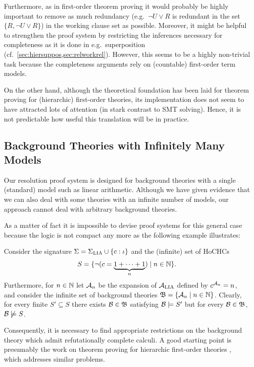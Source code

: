 \documentclass[a4paper,twoside,notitlepage,openright,11pt]{report}
\begin{document}
Furthermore, as in first-order theorem proving it would probably be highly important to remove as much redundancy (e.g.\ $\neg U\lor R$ is redundant in the set $\{R,\neg U\lor R\}$) in the working clause set as possible. Moreover, it might be helpful to strengthen the proof system by restricting the inferences necessary for completeness as it is done in e.g.\ superposition (cf.\ \cref{sec:hiersuppos,sec:relworkrel}). However, this seems to be a highly non-trivial task because the completeness arguments rely on (countable) first-order term models.

On the other hand, although the theoretical foundation has been laid for theorem proving for (hierarchic) first-order theories, its implementation does not seem to have attracted lots of attention (in stark contrast to SMT solving). Hence, it is not predictable how useful this translation will be in practice.

\subsection{Background Theories with Infinitely Many Models}
Our resolution proof system is designed for background theories with a single (standard) model such as linear arithmetic. 
Although we have given evidence that we can also deal with some theories with an infinite number of models, our approach cannot deal with arbitrary background theories.

As a matter of fact it is impossible to devise proof systems for this general case because the logic is not compact any more as the following example illustrates:
\begin{example}
  \label{ex:notcompact}
  Consider the signature $\Sigma=\Sigma_{\operatorname{LIA}}\cup\{c:\iota\}$ and the (infinite) set of HoCHCs
  \begin{align*}
    S=\{\neg (c= \underbrace{1+\cdots+1}_n)\mid n\in\mathbb N\}.
  \end{align*}
  Furthermore, for $n\in\mathbb N$ let $\mathcal A_n$ be the expansion of $\mathcal A_{\operatorname{LIA}}$ defined by $c^{\mathcal A_n}=n$, and consider the infinite set of background theories $\mathfrak B=\{\mathcal A_n\mid n\in\mathbb N\}$. Clearly, for every finite $S'\subseteq S$ there exists $\mathcal B\in\mathfrak B$ satisfying $\mathcal B\models S'$ but for every $\mathcal B\in\mathfrak B$, $\mathcal B\not\models S$.
\end{example}
Consequently, it is necessary to find appropriate restrictions on the background theory which admit refutationally complete calculi. A good starting point is presumably the work on theorem proving for hierarchic first-order theories \cite{BGW94,AKW09}, which addresses similar problems.
\end{document}
